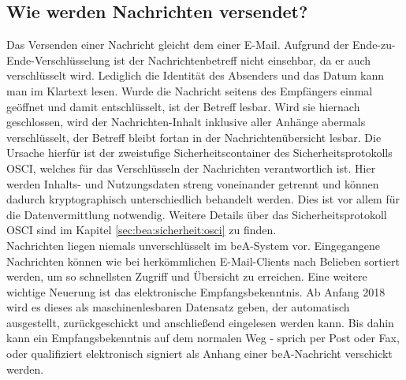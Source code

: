 \subsection{Wie werden Nachrichten versendet?}
Das Versenden einer Nachricht gleicht dem einer E-Mail. Aufgrund der Ende-zu-Ende-Verschlüsselung ist der Nachrichtenbetreff nicht einsehbar, da er auch verschlüsselt wird. Lediglich die Identität des Absenders und das Datum kann man im Klartext lesen. Wurde die Nachricht seitens des Empfängers einmal geöffnet und damit entschlüsselt, ist der Betreff lesbar. Wird sie hiernach geschlossen, wird der Nachrichten-Inhalt inklusive aller Anhänge abermals verschlüsselt, der Betreff bleibt fortan in der Nachrichtenübersicht lesbar. Die Ursache hierfür ist der zweistufige Sicherheitscontainer des Sicherheitsprotokolls OSCI, welches für das Verschlüsseln der Nachrichten verantwortlich ist. Hier werden Inhalts- und Nutzungsdaten streng voneinander getrennt und können dadurch kryptographisch unterschiedlich behandelt werden. Dies ist vor allem für die Datenvermittlung notwendig.\cite{bea:osci} Weitere Details über das Sicherheitsprotokoll OSCI sind im Kapitel \ref{sec:bea:sicherheit:osci} zu finden. \\
Nachrichten liegen niemals unverschlüsselt im beA-System vor. Eingegangene Nachrichten können wie bei herkömmlichen E-Mail-Clients nach Belieben sortiert werden, um so schnellsten Zugriff und Übersicht zu erreichen.
Eine weitere wichtige Neuerung ist das elektronische Empfangsbekenntnis. Ab Anfang 2018 wird es dieses als maschinenlesbaren Datensatz geben, der automatisch ausgestellt, zurückgeschickt und anschließend eingelesen werden kann. Bis dahin kann ein Empfangsbekenntnis auf dem normalen Weg - sprich per Post oder Fax, oder qualifiziert elektronisch signiert als Anhang einer beA-Nachricht verschickt werden. 

